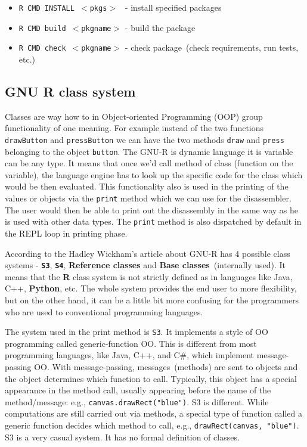 \documentclass[thesis=M,english]{FITthesis}[2018/10/20]
\newcommand{\code}[1]{\texttt{#1}}
\begin{document}
\begin{itemize}
	\item \code{R CMD INSTALL $<$pkgs$>$ } - install specified packages
	\item \code{R CMD build $<$pkgname$>$} - build the package
	\item \code{R CMD check $<$pkgname$>$} - check package~(check requirements, run tests, etc.)
\end{itemize}



\subsection{GNU R class system}\label{R-Classes}

Classes are way how to in Object-oriented Programming (OOP) group functionality of one meaning. For example instead of the two functions \code{drawButton} and \code{pressButton} we can have the two methods \code{draw} and \code{press} belonging to the object \code{button}. The GNU-R is dynamic language it is variable can be any type. It means that once we'd call method of class (function on the variable), the language engine has to look up the specific code for the class which would be then evaluated. This functionality also is used in the printing of the values or objects via the \code{print} method which we can use for the disassembler. The user would then be able to print out the disassembly in the same way as he is used with other data types. The \code{print} method is also dispatched by default in the REPL loop in printing phase.

According to the Hadley Wickham's article about GNU-R	 has 4 possible class systems - \textbf{\code{S3}}, \textbf{\code{S4}}, \textbf{Reference classes} and \textbf{Base classes}~(internally used). It means that the \textbf{R} class system is not strictly defined as in languages like Java, C++, \textbf{Python}, etc. The whole system provides the end user to more flexibility, but on the other hand, it can be a little bit more confusing for the programmers who are used to conventional programming languages.

The system used in the print method is \code{S3}. It implements a style of OO programming called generic-function OO. This is different from most programming languages, like Java, C++, and C{\#}, which implement message-passing OO. With message-passing, messages~(methods) are sent to objects and the object determines which function to call. Typically, this object has a special appearance in the method call, usually appearing before the name of the method/message: e.g., \code{canvas.drawRect("blue")}. S3 is different. While computations are still carried out via methods, a special type of function called a generic function decides which method to call, e.g., \code{drawRect(canvas, "blue")}. S3 is a very casual system. It has no formal definition of classes.
\end{document}
